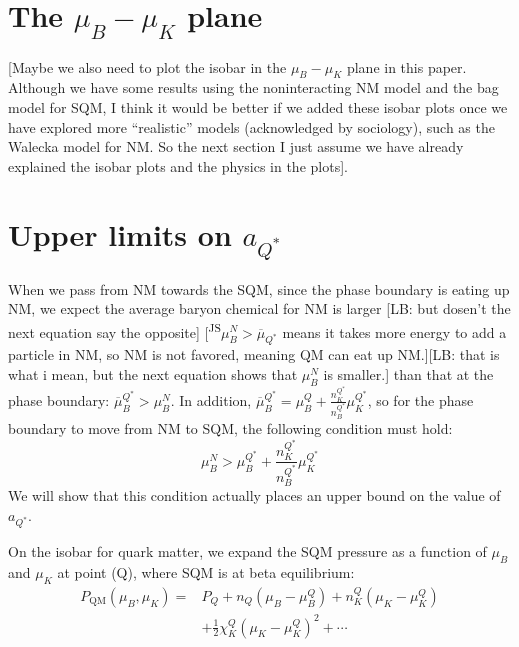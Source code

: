 \documentclass[superscriptaddress,amsmath,floatfix,aps,prc,twocolumn]{revtex4-1}
\newcommand{\com}[1]{{\sf\color[rgb]{0,0,1}[#1]}}
\newcommand{\JS}[1]{\textsf{\color{violet} {[\textsuperscript{JS}#1]}}}
\begin{document}
\section{The $\mu_B-\mu_K$ plane}

[Maybe we also need to plot the isobar in the  $\mu_B-\mu_K$ plane in this paper. Although we have some results using the noninteracting NM model and the bag model for SQM, I think it would be better if we added these isobar plots once we have explored more ``realistic'' models (acknowledged by sociology), such as the Walecka model for NM. So the next section I just assume we have already explained the isobar plots and the physics in the plots].

\section{Upper limits on $a_{Q^*}$}

When we pass from NM towards the SQM, since the phase boundary is eating up NM, we expect the average baryon chemical for NM is larger \com{LB: but dosen't the next equation say the opposite} \JS{$\mu_B^N>\overline{\mu}_{Q^*}$ means it takes more energy to add a particle in NM, so NM is not favored, meaning QM can eat up NM.}\com{LB: that is what i mean, but the next equation shows that $\mu_B^N$ is smaller.} than that at the phase boundary: $\overline{\mu}_B^{Q^*} > \mu_B^N$. In addition, $\overline{\mu}_B^{Q^*} = \mu_B^Q + \frac{n_K^{Q^*}}{n_B^{Q^*}}\mu_K^{Q^*}$, so for the phase boundary to move from NM to SQM, the following condition must hold: %
\begin{equation}
    \mu_B^N > \mu_B^{Q^*} + \frac{n_K^{Q^*}}{n_B^{Q^*}}\mu_K^{Q^*} \label{Upper_lim_1}
\end{equation}
We will show that this condition actually places an upper bound on the value of $a_{Q^*}$. 

On the isobar for quark matter, we expand the SQM pressure as a function of $\mu_B$ and $\mu_K$ at point (Q), where SQM is at beta equilibrium:
\begin{equation}
\begin{aligned}
P_{\mathrm{QM}}(\mu_B, \mu_K) = & P_Q + n_Q(\mu_B - \mu_B^{Q}) + n_K^Q(\mu_K - \mu_K^{Q}) \\ 
& + \frac{1}{2} \chi_K^Q (\mu_K - \mu_K^Q)^2 + \cdots
\end{aligned}
\label{Upper_lim_2}
\end{equation}
\end{document}
